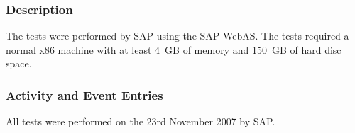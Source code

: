 




\subsubsection{Description}
The tests were performed by SAP using the SAP WebAS. The tests required a normal x86 machine with at least 4~GB of memory and 150~GB of hard disc space.

\subsubsection{Activity and Event Entries}
All tests were performed on the 23rd November 2007 by SAP.


